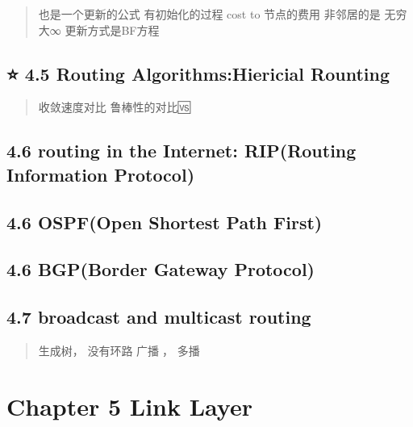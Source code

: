\documentclass[
]{article}
\begin{document}
\begin{quote}
也是一个更新的公式 有初始化的过程 cost to 节点的费用 非邻居的是 无穷大∞
更新方式是BF方程
\end{quote}

\hypertarget{-45-routing-algorithmshiericial-rounting}{%
\subsection{⭐️ 4.5 Routing Algorithms:Hiericial
Rounting}\label{-45-routing-algorithmshiericial-rounting}}

\begin{quote}
收敛速度对比 鲁棒性的对比🆚
\end{quote}

\hypertarget{46-routing-in-the-internet-riprouting-information-protocol}{%
\subsection{4.6 routing in the Internet: RIP(Routing Information
Protocol)}\label{46-routing-in-the-internet-riprouting-information-protocol}}

\hypertarget{46-ospfopen-shortest-path-first}{%
\subsection{4.6 OSPF(Open Shortest Path
First)}\label{46-ospfopen-shortest-path-first}}

\hypertarget{46-bgpborder-gateway-protocol}{%
\subsection{4.6 BGP(Border Gateway
Protocol)}\label{46-bgpborder-gateway-protocol}}

\hypertarget{47-broadcast-and-multicast-routing}{%
\subsection{4.7 broadcast and multicast
routing}\label{47-broadcast-and-multicast-routing}}

\begin{quote}
生成树， 没有环路 广播📢， 多播
\end{quote}

\hypertarget{chapter-5-link-layer}{%
\section{Chapter 5 Link Layer}\label{chapter-5-link-layer}}
\end{document}
